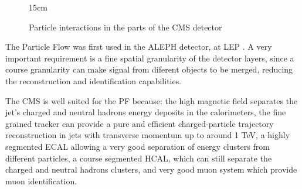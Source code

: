 \begin{figure}[!htm]{15cm} %
\caption{Particle interactions in the parts of the CMS detector}%
\label{fig:pf_cms}
\end{figure}

The Particle Flow was first used in the ALEPH detector, at LEP \cite{ALEPH:1994ayc}. A very important requirement is a fine spatial granularity of the detector layers, since a course granularity can make signal from diferent objects to be merged, reducing the reconstruction and identification capabilities.

The CMS is well suited for the PF because: the high magnetic field separates the jet's charged and neutral hadrons energy deposits in the calorimeters, the fine grained tracker can provide a pure and efficient charged-particle trajectory reconstruction in jets with transverse momentum up to around 1 TeV, a highly segmented ECAL allowing a very good separation of energy clusters from different particles, a course segmented HCAL, which can still separate the charged and neutral hadrons clusters, and very good muon system which provide muon identification.